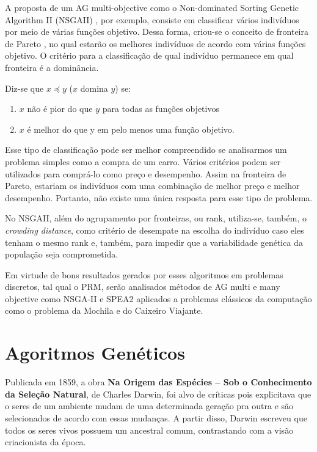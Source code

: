 \documentclass[]{article}
\begin{document}
	A proposta de um AG multi-objective como o Non-dominated Sorting Genetic Algorithm II (NSGAII) \cite{NSGAII}, por exemplo, consiste em classificar vários indivíduos por meio de várias funções objetivo. Dessa forma, criou-se o conceito de fronteira de Pareto  \cite{Pareto}, no qual estarão os melhores indivíduos de acordo com várias funções objetivo. O critério para a classificação de qual indivíduo permanece em qual fronteira é a dominância.
	
	Diz-se que $x \preceq y$ ($x$ domina $y$) se:
	
	\begin{enumerate}
		\item $x$ não é pior do que $y$ para todas as funções objetivos
		
		\item $x$ é melhor do que y em pelo menos uma função objetivo.
	\end{enumerate}
	
	Esse tipo de classificação pode ser melhor compreendido se analisarmos um problema simples como a compra de um carro. Vários critérios podem ser utilizados para comprá-lo como preço e desempenho. Assim na fronteira de Pareto, estariam os indivíduos com uma combinação de melhor preço e melhor desempenho. Portanto, não existe uma única resposta para esse tipo de problema.
	
	No  NSGAII, além do agrupamento por fronteiras, ou rank, utiliza-se, também, o \textit{crowding distance}, como critério de desempate na escolha do indivíduo caso eles tenham o mesmo rank e, também, para impedir que a variabilidade genética da população seja comprometida.
	
	Em virtude de bons resultados gerados por esses algoritmos em problemas discretos, tal qual o PRM, serão analisados métodos de AG multi e many objective como NSGA-II e SPEA2 aplicados a problemas clássicos da computação como o problema da Mochila e do Caixeiro Viajante. 
	
\section{Agoritmos Genéticos}

	Publicada em 1859, a obra \textbf{Na Origem das Espécies – Sob o Conhecimento da Seleção Natural}, de Charles Darwin, foi alvo de críticas pois explicitava que o seres de um ambiente mudam de uma determinada geração pra outra e são selecionados de acordo com essas mudanças. A partir disso, Darwin escreveu que todos os seres vivos possuem um ancestral comum, contrastando com a visão criacionista da época.
	
\end{document}
